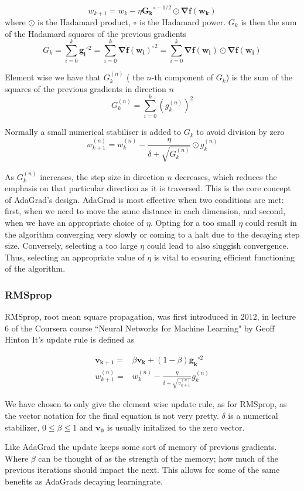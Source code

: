 \documentclass{article}
\theoremstyle{definition}
\begin{document}
\[ w_{k+1}= w_{k}-\eta \mathbf{G_{k}}^{\circ -1/2} \odot \mathbf{\nabla f(w_k)} \]
where $\odot$ is the Hadamard product, $\circ$ is the Hadamard power. $G_k$ is then the sum of the Hadamard squares of the previous gradients 
\begin{equation}
    G_k = \sum_{i = 0}^k \mathbf{g_i}^{\circ 2} = \sum_{i = 0}^k \mathbf{\nabla f(w_i)}^{\circ 2} = \sum_{i = 0}^k \mathbf{\nabla f(w_i)} \odot \mathbf{\nabla f(w_i)}
\end{equation}

 Element wise we have that $G_{k}^{(n)}$ ( the $n$-th component of $G_k$) is the sum of the squares of the previous gradients in direction $n$
 \[
 G_{k}^{(n)} = \sum_{i=0}^k  \left(g_k^{(n)}\right)^2 
 \]

 Normally a small numerical stabiliser is added to $G_k$ to avoid division by zero
 \[
 w_{k+1}^{(n)}= w_{k}^{(n)}- \frac{\eta}{\delta + \sqrt{G_{k}^{(n)}}} \odot g_k^{(n)}
 \]
 

As $G_k^{(n)}$ increases, the step size in direction $n$ decreases, which reduces the emphasis on that particular direction as it is traversed. This is the core concept of AdaGrad's design. AdaGrad is most effective when two conditions are met: first, when we need to move the same distance in each dimension, and second, when we have an appropriate choice of $\eta$. Opting for a too small $\eta$ could result in the algorithm converging very slowly or coming to a halt due to the decaying step size. Conversely, selecting a too large $\eta$ could lead to also sluggish convergence. Thus, selecting an appropriate value of $\eta$ is vital to ensuring efficient functioning of the algorithm. 


\subsubsection{RMSprop}
RMSprop, root mean square propagation, was first introduced in 2012, in lecture 6 of the Coursera course ``Neural Networks for Machine Learning" by Geoff Hinton
\cite{NNforML-Lecture6} It's update rule is defined as 

\begin{align*}
    \mathbf{v_{k+1}} =& \beta \mathbf{v_{k}} + (1-\beta) \mathbf{g_k}^{\circ 2}\\
    w_{k+1}^{(n)} =& w_k^{(n)} - \frac{\eta}{\delta +  \sqrt{v_{k+1}^{(n)}}} g_k^{(n)}
\end{align*}

 We have chosen to only give the element wise update rule, as for RMSprop, as the vector notation for the final equation is not very pretty. $\delta$ is a numerical stabilizer, $0\leq \beta \leq 1$ and $\mathbf{v_0}$ is usually initalized to the zero vector.
\par
\vspace{1mm}
Like AdaGrad the update keeps some sort of memory of previous gradients. Where $\beta$ can be thought of as the strength of the memory; how much of the previous iterations should impact the next. This allows for some of the same benefits as AdaGrads decaying learningrate.
\end{document}
